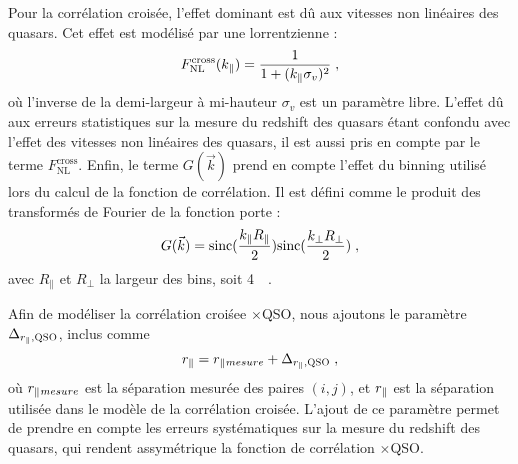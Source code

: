 \documentclass[11pt, twoside, a4paper, openright]{report}
\begin{document}
Pour la corrélation croisée, l'effet dominant est dû aux vitesses non linéaires des quasars. Cet effet est modélisé par une lorrentzienne :
\begin{equation}
  F_{\mathrm{NL}}^{\mathrm{cross}}(k_{\parallel}{}) = \frac{1}{1 + (k_{\parallel}{} \sigma_v)^2} \; ,
\end{equation}
où l'inverse de la demi-largeur à mi-hauteur $\sigma_v$ est un paramètre libre. L'effet dû aux erreurs statistiques sur la mesure du redshift des quasars étant confondu avec l'effet des vitesses non linéaires des quasars, il est aussi pris en compte par le terme $  F_{\mathrm{NL}}^{\mathrm{cross}}$.
Enfin, le terme $G(\vec k)$ prend en compte l'effet du binning utilisé lors du calcul de la fonction de corrélation.
Il est défini comme le produit des transformés de Fourier de la fonction porte :
\begin{equation}
  G(\vec k) = \mathrm{sinc}(\frac{k_{\parallel}{}R_{\parallel}}{2})\mathrm{sinc}(\frac{k_{\perp}{}R_{\perp}}{2}) \; ,
\end{equation}
avec $R_{\parallel}$ et $R_{\perp}$ la largeur des bins, soit \SI{4}{\perh\Mpc}.

Afin de modéliser la corrélation croiśee \lya{}$\times$QSO, nous ajoutons le paramètre $\Delta_{r_{\parallel}{}, \textsc{QSO}}$, inclus comme
\begin{equation}
  r_{\parallel}{} = r_{\parallel}{}_{mesure} + \Delta_{r_{\parallel}{}, \textsc{QSO}} \; ,
\end{equation}
où $r_{\parallel}{}_{mesure}$ est la séparation mesurée des paires $(i,j)$, et $r_{\parallel}{}$ est la séparation utilisée dans le modèle de la corrélation croisée. L'ajout de ce paramètre permet de prendre en compte les erreurs systématiques sur la mesure du redshift des quasars, qui rendent assymétrique la fonction de corrélation \lya{}$\times$QSO.

\end{document}
